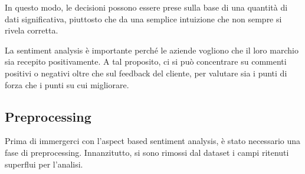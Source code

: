\documentclass[a4paper,12pt]{article}
\begin{document}
\noindent In questo modo, le decisioni possono essere prese sulla base di una quantità di
dati significativa, piuttosto che da una semplice intuizione che non sempre si
rivela corretta.

\noindent La sentiment analysis è importante perché le aziende vogliono che il loro marchio sia recepito positivamente. A tal proposito, ci si può concentrare su commenti positivi o negativi oltre che sul feedback del cliente, per valutare sia i punti di forza che i punti su cui migliorare.

\newpage

\subsection{Preprocessing}
Prima di immergerci con l'aspect based sentiment analysis, è stato necessario
una fase di preprocessing.
Innanzitutto, si sono rimossi dal dataset i campi ritenuti superflui per l’analisi.
\end{document}
